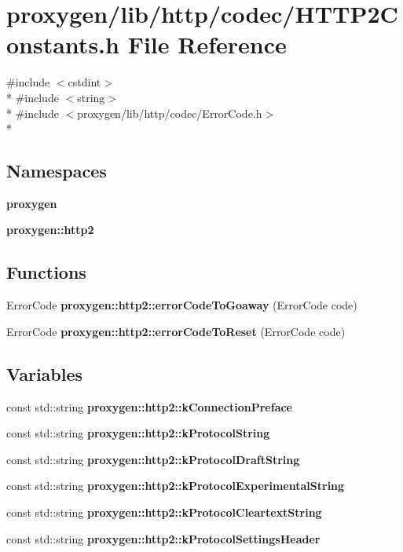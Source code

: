 \section{proxygen/lib/http/codec/\+H\+T\+T\+P2\+Constants.h File Reference}
\label{HTTP2Constants_8h}
{\ttfamily \#include $<$cstdint$>$}\\*
{\ttfamily \#include $<$string$>$}\\*
{\ttfamily \#include $<$proxygen/lib/http/codec/\+Error\+Code.\+h$>$}\\*
\subsection*{Namespaces}
\begin{DoxyCompactItemize}
\item 
 {\bf proxygen}
\item 
 {\bf proxygen\+::http2}
\end{DoxyCompactItemize}
\subsection*{Functions}
\begin{DoxyCompactItemize}
\item 
Error\+Code {\bf proxygen\+::http2\+::error\+Code\+To\+Goaway} (Error\+Code code)
\item 
Error\+Code {\bf proxygen\+::http2\+::error\+Code\+To\+Reset} (Error\+Code code)
\end{DoxyCompactItemize}
\subsection*{Variables}
\begin{DoxyCompactItemize}
\item 
const std\+::string {\bf proxygen\+::http2\+::k\+Connection\+Preface}
\item 
const std\+::string {\bf proxygen\+::http2\+::k\+Protocol\+String}
\item 
const std\+::string {\bf proxygen\+::http2\+::k\+Protocol\+Draft\+String}
\item 
const std\+::string {\bf proxygen\+::http2\+::k\+Protocol\+Experimental\+String}
\item 
const std\+::string {\bf proxygen\+::http2\+::k\+Protocol\+Cleartext\+String}
\item 
const std\+::string {\bf proxygen\+::http2\+::k\+Protocol\+Settings\+Header}
\end{DoxyCompactItemize}
